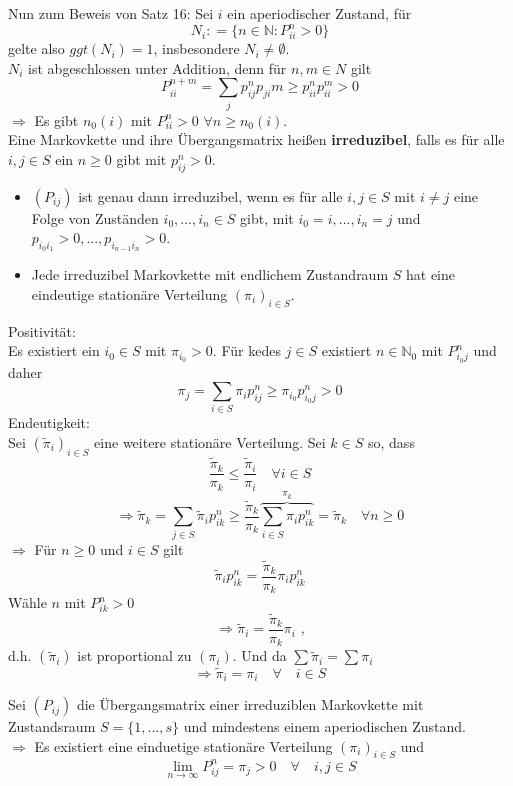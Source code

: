 \documentclass[a4paper,12pt]{article}
\begin{document}
Nun zum Beweis von Satz 16:
Sei $i$ ein aperiodischer Zustand, für 
$$
N_i: = \{n \in \mathbb{N}: P_{ii}^n > 0\}
$$
gelte also $ggt(N_i) = 1$, insbesondere $N_i \neq \emptyset$.\\
$N_i $ ist abgeschlossen unter Addition, denn für $n,m \in N$ gilt 
$$
P_{ii}^{n+m} = \sum_{j}p_{ij}^np_{ji}m \geq p_{ii}^np_{ii}^m > 0
$$
$\Rightarrow$ Es gibt $n_0(i)$ mit $P_{ii}^n>0$ $\forall n \geq n_0(i)$.\\


Eine Markovkette und ihre Übergangsmatrix heißen \textbf{irreduzibel}, falls es für alle $i, j \in S$ ein $n \geq 0$ gibt
mit $p_{ij}^n>0$.
\begin{itemize}
	\item $(P_{ij})$ ist genau dann irreduzibel, wenn es für alle $i,j \in S$ mit $i \neq j$ eine Folge von Zuständen 
	$i_0, ..., i_n \in S$ gibt, mit $i_0 = i, ..., i_n = j$ und $p_{i_0i_1}>0, ..., p_{i_{n-1}i_n}> 0$.
	\item Jede irreduzibel Markovkette mit endlichem Zustandraum $S$ hat eine eindeutige stationäre Verteilung $(\pi_i)_{i \in S}$.
\end{itemize}
Positivität:\\
Es existiert ein $i_0 \in S$ mit $\pi_{i_0}>0$. Für kedes $j \in S$ existiert $n \in \mathbb{N}_0$ mit $P_{i_0j}^n$ und daher
$$
\pi_j = \sum_{i \in S}\pi_ip_{ij}^n \geq \pi_{i_0}p_{i_0j}^n > 0
$$
Endeutigkeit:\\
Sei $(\tilde{\pi}_i)_{i \in S}$ eine weitere stationäre Verteilung.
Sei $k \in S$ so, dass$$
\frac{\tilde{\pi}_k}{\pi_k} \leq \frac{\tilde{\pi}_i}{\pi_i} \quad \forall i \in S
$$
$$
\Rightarrow \tilde{\pi}_k = \sum_{j \in S}\tilde{\pi}_ip_{ik}^n \geq \frac{\tilde{\pi}_k}{\pi_k} \overbrace{\sum_{i \in S}\pi_ip_{ik}^n}^{\pi_k} = \tilde{\pi}_k \quad \forall n \geq 0
$$
$\Rightarrow$ Für $n \geq 0$ und $i \in S$ gilt
$$
	\tilde{\pi}_ip_{ik}^n = \frac{\tilde{\pi}_k}{\pi_k}\pi_ip_{ik}^n
$$
Wähle $n$ mit $P_{ik}^n > 0$
$$
\Rightarrow \tilde{\pi}_i = \frac{\tilde{\pi}_k}{\pi_k}\pi_i \text{ ,}
$$
d.h. $(\tilde{\pi}_i)$ ist proportional zu $(\pi_i)$.
Und da $\sum \tilde{\pi}_i = \sum \pi_i$
$$
\Rightarrow \tilde{\pi}_i = \pi_i \quad \forall \quad i \in S
$$



\begin{tcolorbox}[breakable, colframe=green, colback=white, title=Satz 17]
Sei $(P_{ij})$ die Übergangsmatrix einer irreduziblen Markovkette mit Zustandsraum
$S = \{1,...,s\}$ und mindestens einem aperiodischen Zustand.\\
$\Rightarrow$ Es existiert eine einduetige stationäre Verteilung $(\pi_i)_{i \in S}$ und 
$$
\lim_{n \to \infty}P_{ij}^n = \pi_j > 0 \quad \forall \quad i,j \in S
$$
\end{tcolorbox}
\end{document}
